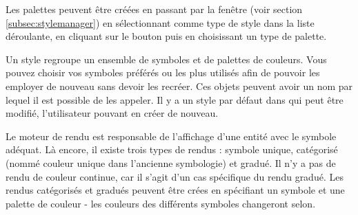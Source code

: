 Les palettes peuvent être créées en passant par la fenêtre  (voir section \ref{subsec:stylemanager}) en sélectionnant  comme type de style dans la liste déroulante, en cliquant sur le bouton  puis en choisissant un type de palette.


Un style regroupe un ensemble de symboles et de palettes de couleurs. Vous pouvez choisir vos symboles préférés ou les plus utilisés afin de pouvoir les employer de nouveau sans devoir les recréer. Ces objets peuvent avoir un nom par lequel il est possible de les appeler. Il y a un style par défaut dans \qg qui peut être modifié, l'utilisateur pouvant en créer de nouveau.


Le moteur de rendu est responsable de l'affichage d'une entité avec le symbole adéquat. Là encore, il existe trois types de rendus : symbole unique, catégorisé (nommé couleur unique dans l'ancienne symbologie) et gradué. Il n'y a pas de rendu de couleur continue, car il s'agit d'un cas spécifique du rendu gradué. Les rendus catégorisés et gradués peuvent être crées en spécifiant un symbole et une palette de couleur - les couleurs des différents symboles changeront selon.

